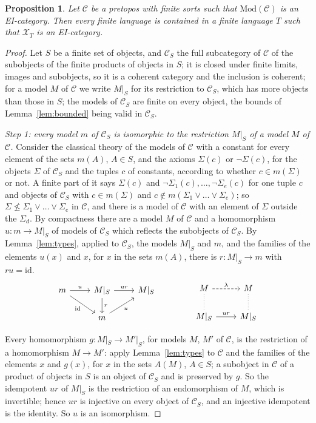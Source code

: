 \documentclass[11pt]{amsart}
\newtheorem{prop}[thm]{Proposition}
\theoremstyle{definition}
\newcommand{\Mod}{\mathrm{Mod}}
\newcommand{\cX}{\mathcal X}
\newcommand{\cC}{\mathcal C}
\newcommand{\id}{\mathrm{id}}
\begin{document}
\begin{prop}\label{prop:cofinal}
Let $\cC$ be a pretopos with finite sorts such that $\Mod(\cC)$ is an
EI-category. Then every finite language is contained in a finite
language $T$ such that $\cX_T$ is an EI-category.
\end{prop}
\begin{proof}
Let $S$ be a finite set of objects, and $\cC_S$ the full subcategory
of $\cC$ of the subobjects of the finite products of objects in $S$;
it is closed under finite limits, images and subobjects, so it is a
coherent category and the inclusion is coherent; for a model $M$ of
$\cC$ we write $M|_S$ for its restriction to $\cC_S$, which has more
objects than those in $S$; the models of $\cC_S$ are
finite on every object, the bounds of Lemma~\ref{lem:bounded} being
valid in $\cC_S$.

\emph{Step 1: every model $m$ of $\cC_S$ is isomorphic to the
restriction $M|_S$ of a model $M$ of $\cC$.} Consider the classical
theory of the models of $\cC$ with a constant for every element of
the sets $m(A)$, $A\in S$, and the axioms $\Sigma(c)$ or
$\neg\Sigma(c)$, for the objects $\Sigma$ of $\cC_S$ and the tuples
$c$ of constants, according to whether $c\in m(\Sigma)$ or not. A
finite part of it says $\Sigma(c)$ and $\neg\Sigma_1(c),\dots,
\neg\Sigma_e(c)$ for one tuple $c$ and objects of $\cC_S$ with
$c\in m(\Sigma)$ and $c\notin m(\Sigma_1\vee\dots\vee\Sigma_e)$; so
$\Sigma\not\le\Sigma_1\vee\dots\vee\Sigma_e$ in $\cC$, and there is a
model of $\cC$ with an element of $\Sigma$ outside the $\Sigma_d$. By
compactness there are a model $M$ of $\cC$ and a homomorphism $u\colon
m\to M|_S$ of models of $\cC_S$ which reflects the subobjects of
$\cC_S$. By Lemma~\ref{lem:types}, applied to $\cC_S$, the models
$M|_S$ and $m$, and the families of the elements $u(x)$ and $x$, for
$x$ in the sets $m(A)$, there is $r\colon M|_S\to m$ with $ru=\id$.
\[
\begin{tikzcd}
m\ar[r,"u"]\ar[dr,"\id"']&M|_S\ar[d,"r"]\ar[r,"ur"]&M|_S\\
&m\ar[ur,"u"']&
\end{tikzcd}
\qquad\qquad
\begin{tikzcd}
M\ar[r,dashed,"\lambda"]&M\\
M|_S\ar[r,"ur"]\ar[u,dash,dotted]&M|_S\ar[u,dash,dotted]
\end{tikzcd}
\]

Every homomorphism $g\colon M|_S\to M'|_S$, for models $M$, $M'$ of
$\cC$, is the restriction of a homomorphism $M\to M'$: apply
Lemma~\ref{lem:types} to $\cC$ and the families of the elements $x$
and $g(x)$, for $x$ in the sets $A(M)$, $A\in S$; a subobject in $\cC$
of a product of objects in $S$ is an object of $\cC_S$ and is
preserved by $g$. So the idempotent $ur$ of $M|_S$ is the restriction
of an endomorphism of $M$, which is invertible; hence $ur$ is
injective on every object of $\cC_S$, and an injective idempotent is
the identity. So $u$ is an isomorphism.


\end{proof}
\end{document}
